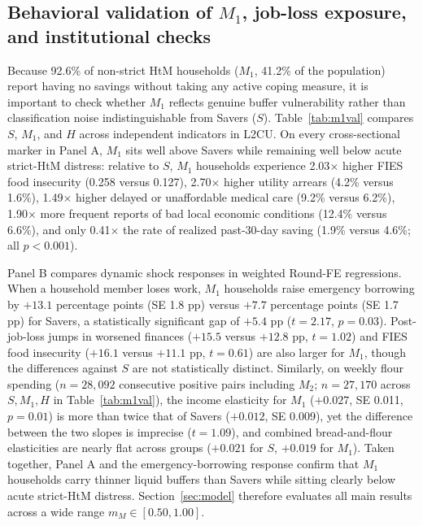 \documentclass[11pt]{article}
\begin{document}
\subsection{Behavioral validation of \texorpdfstring{$M_1$}{M1}, job-loss exposure, and institutional checks}\label{sec:exposure}

Because 92.6\% of non-strict HtM households ($M_1$, 41.2\% of the population) report having no savings without taking any active coping measure, it is important to check whether $M_1$ reflects genuine buffer vulnerability rather than classification noise indistinguishable from Savers ($S$). Table~\ref{tab:m1val} compares $S$, $M_1$, and $H$ across independent indicators in L2CU. On every cross-sectional marker in Panel A, $M_1$ sits well above Savers while remaining well below acute strict-HtM distress: relative to $S$, $M_1$ households experience 2.03$\times$ higher FIES food insecurity (0.258 versus 0.127), 2.70$\times$ higher utility arrears (4.2\% versus 1.6\%), 1.49$\times$ higher delayed or unaffordable medical care (9.2\% versus 6.2\%), 1.90$\times$ more frequent reports of bad local economic conditions (12.4\% versus 6.6\%), and only 0.41$\times$ the rate of realized past-30-day saving (1.9\% versus 4.6\%; all $p < 0.001$).

Panel B compares dynamic shock responses in weighted Round-FE regressions. When a household member loses work, $M_1$ households raise emergency borrowing by $+13.1$ percentage points (SE 1.8 pp) versus $+7.7$ percentage points (SE 1.7 pp) for Savers, a statistically significant gap of $+5.4$ pp ($t = 2.17$, $p = 0.03$). Post-job-loss jumps in worsened finances ($+15.5$ versus $+12.8$ pp, $t = 1.02$) and FIES food insecurity ($+16.1$ versus $+11.1$ pp, $t = 0.61$) are also larger for $M_1$, though the differences against $S$ are not statistically distinct. Similarly, on weekly flour spending ($n = 28{,}092$ consecutive positive pairs including $M_2$; $n = 27{,}170$ across $S, M_1, H$ in Table~\ref{tab:m1val}), the income elasticity for $M_1$ ($+0.027$, SE 0.011, $p = 0.01$) is more than twice that of Savers ($+0.012$, SE 0.009), yet the difference between the two slopes is imprecise ($t = 1.09$), and combined bread-and-flour elasticities are nearly flat across groups ($+0.021$ for $S$, $+0.019$ for $M_1$). Taken together, Panel A and the emergency-borrowing response confirm that $M_1$ households carry thinner liquid buffers than Savers while sitting clearly below acute strict-HtM distress. Section~\ref{sec:model} therefore evaluates all main results across a wide range $m_M \in [0.50, 1.00]$.
\end{document}
